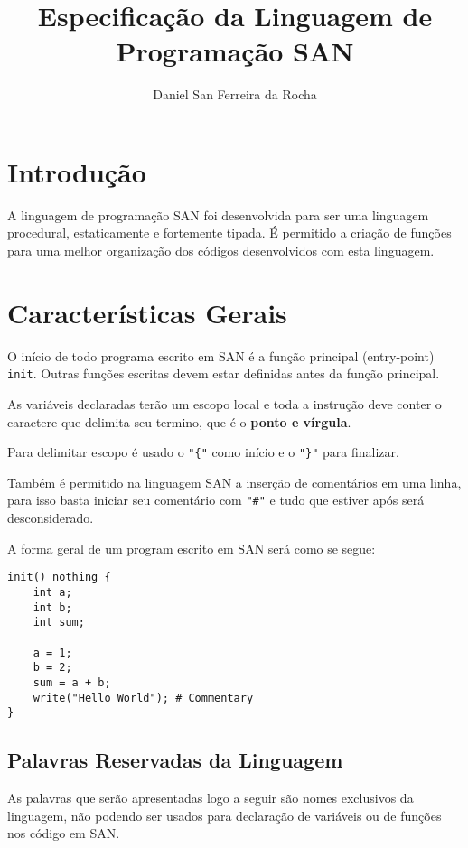 \documentclass[a4paper,12pt]{article}
\title{Especificação da Linguagem de Programação SAN}
\author{Daniel San Ferreira da Rocha}
\begin{document}
\clearpage\maketitle
\thispagestyle{empty}

\pagebreak

\tableofcontents

\pagebreak

\section{Introdução}
A linguagem de programação SAN foi desenvolvida para ser uma linguagem procedural, estaticamente
e fortemente tipada. É permitido a criação de funções para uma melhor organização dos códigos
desenvolvidos com esta linguagem.

\section{Características Gerais}
O início de todo programa escrito em SAN é a função principal (entry-point) \texttt{init}.
Outras funções escritas devem estar definidas antes da função principal.

As variáveis declaradas terão um escopo local e toda a instrução deve conter o caractere que
delimita seu termino, que é o \textbf{ponto e vírgula}.

Para delimitar escopo é usado o \texttt{"\{"} como início e o \texttt{"\}"} para finalizar.

Também é permitido na linguagem SAN a inserção de comentários em uma linha, para isso basta
iniciar seu comentário com \texttt{"\#"} e tudo que estiver após será desconsiderado.

A forma geral de um program escrito em SAN será como se segue:
\begin{lstlisting}
init() nothing {
    int a;
    int b;
    int sum;

    a = 1;
    b = 2;
    sum = a + b;
    write("Hello World"); # Commentary
}
\end{lstlisting}

\subsection{Palavras Reservadas da Linguagem}
As palavras que serão apresentadas logo a seguir são nomes exclusivos da linguagem, não podendo
ser usados para declaração de variáveis ou de funções nos código em SAN.
\end{document}
